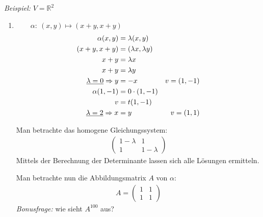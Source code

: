 \documentclass[%
a4paper,
11pt,		%
]
{scrartcl}
\newcommand{\R}{\mathbb{R}}
\theoremstyle{plain}
\theoremstyle{plain}
\theoremstyle{plain}
\theoremstyle{plain}
\theoremstyle{plain}
\begin{document}
\textit{Beispiel:} $V = \R^2$
\begin{enumerate}
    \item $\qquad \alpha:\ (x,y) \mapsto (x+y,x+y)$
        \begin{align*}
            \alpha(x,y) & = \lambda(x,y)\\
            (x+y,x+y) & = (\lambda x, \lambda y)\\
            x+y & = \lambda x\\
            x+y & = \lambda y\\
            \uline{\lambda = 0} \Rightarrow y & = -x & v = (1,-1)\\
            \alpha(1,-1) & = 0 \cdot (1,-1)\\
            v & = t(1,-1)\\
            \uline{\lambda = 2} \Rightarrow x & = y & v = (1,1)
        \end{align*}

        Man betrachte das homogene Gleichungssystem:
        \begin{align*}
            \begin{pmatrix}
                1-\lambda & 1\\
                1 & 1-\lambda
            \end{pmatrix}
        \end{align*}
        Mittels der Berechnung der Determinante lassen sich alle Lösungen ermitteln.

        Man betrachte nun die Abbildungsmatrix $A$ von $\alpha$:
        \begin{align*}
            A = 
            \begin{pmatrix}
                1 & 1\\
                1 & 1
            \end{pmatrix}
        \end{align*}
        \textit{Bonusfrage:} wie sieht $A^{100}$ aus?


\end{enumerate}
\end{document}
